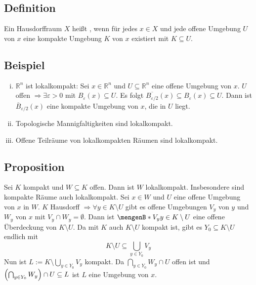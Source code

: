 \subsection[Definition: lokalkompakt]{Definition} %
\label{sub:53}
Ein Hausdorffraum $X$ heißt , wenn für jedes $x \in X$ und jede offene Umgebung $U$ von $x$ eine kompakte Umgebung $K$ von $x$ existiert mit 
$K \subseteq U$.

\subsection[Bespiele für lokalkompakte Hausdorffräume]{Beispiel} %
\label{sub:54}
\begin{enumerate}[(i)]
	\item $\mathds{R}^n$ ist lokalkompakt: Sei $x \in \mathds{R}^n$ und $U \subseteq \mathds{R}^n$ eine offene Umgebung von $x$. $U$ offen 
	$\Rightarrow \exists \varepsilon >0$ mit $B_\varepsilon(x) \subseteq U$. Es folgt $\overline{B_{\varepsilon/2}}(x) \subseteq B_\varepsilon(x) \subseteq U $. Dann
	ist $\overline{B}_{\varepsilon/2}(x)$ eine kompakte Umgebung von $x$, die in $U$ liegt.
	\item Topologische Mannigfaltigkeiten sind lokalkompakt.
	\item Offene Teilräume von lokalkompakten Räumen sind lokalkompakt.
\end{enumerate}

\subsection[Proposition: Offene Teilmengen kompakter Räume sind lokalkompakt]{Proposition} %
\label{sub:55}
Sei $K$ kompakt und $W \subseteq K$ offen. Dann ist $W$ lokalkompakt. Insbesondere sind kompakte Räume auch lokalkompakt.
Sei $x \in W$ und $U$ eine offene Umgebung von $x$ in $W$. $K$ Hausdorff $\Rightarrow \forall y \in K \setminus U$ gibt es offene Umgebungen $V_y$ von $y$ und $W_y$ von $x$
mit $V_y \cap W_y = \emptyset$. Dann ist $\set[V_y]{y \in K \setminus U} $ eine offene Überdeckung von $K \setminus U$. Da mit $K$ auch $K \setminus U$ kompakt ist, gibt es
$Y_0 \subseteq K\setminus U$ endlich mit 
\[
	K\setminus U \subseteq \bigcup_{y \in Y_0} V_y
\]
Nun ist $L := K \setminus \bigcup_{y \in Y_0} V_y$ kompakt. Da $\bigcap_{y \in Y_0} W_y \cap U$ offen ist und 
$\enbrace*{\bigcap_{y \in Y_0} W_y} \cap U \subseteq  L$ ist $L$ eine Umgebung von $x$. \bewende

